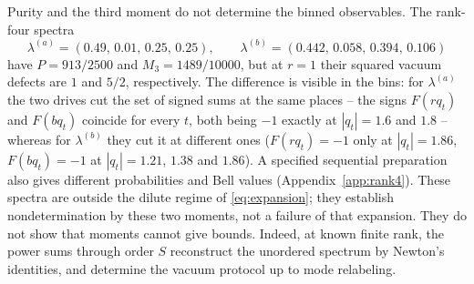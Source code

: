 \documentclass[11pt,a4paper]{article}
\begin{document}
Purity and the third moment do not determine the binned observables. The rank-four spectra
\begin{equation}
\lambda^{(a)}=(0.49,\,0.01,\,0.25,\,0.25),\qquad
\lambda^{(b)}=(0.442,\,0.058,\,0.394,\,0.106)
\label{eq:pair}
\end{equation}
have $P=913/2500$ and $M_3=1489/10000$, but at $r=1$ their squared vacuum defects are $1$ and $5/2$, respectively. The difference is visible in the bins: for $\lambda^{(a)}$ the two drives cut the set of signed sums at the same places -- the signs $F(rq_t)$ and $F(bq_t)$ coincide for every $t$, both being $-1$ exactly at $|q_t|=1.6$ and $1.8$ -- whereas for $\lambda^{(b)}$ they cut it at different ones ($F(rq_t)=-1$ only at $|q_t|=1.86$, $F(bq_t)=-1$ at $|q_t|=1.21$, $1.38$ and $1.86$). A specified sequential preparation also gives different probabilities and Bell values (Appendix~\ref{app:rank4}). These spectra are outside the dilute regime of \eqref{eq:expansion}; they establish nondetermination by these two moments, not a failure of that expansion. They do not show that moments cannot give bounds. Indeed, at known finite rank, the power sums through order $S$ reconstruct the unordered spectrum by Newton's identities, and determine the vacuum protocol up to mode relabeling.
\end{document}
